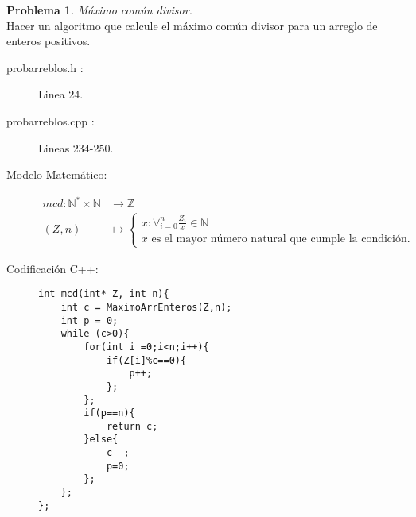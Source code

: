 \documentclass{article}
\theoremstyle{plain}
\theoremstyle{definition}
\newtheorem{problem}{Problema}
\begin{document}
\begin{problem} \emph{Máximo común divisor.}\\
\hspace*{7mm}Hacer un algoritmo que calcule el máximo común divisor para un arreglo de enteros positivos.
\begin{description}
\item[probarreblos.h :] Linea 24. \item[probarreblos.cpp :] Lineas 234-250.

\item[Modelo Matemático:]
\begin{align*}
mcd: \mathbb{N}^{*}\times\mathbb{N} &\to \mathbb{Z}\\
(Z,n) &\mapsto
\begin{cases}
x:\forall_{i=0}^{n} \frac{Z_{i}}{x}\in \mathbb{N}\\
\text{$x$ es el mayor número natural que cumple la condición.}
\end{cases}
\end{align*}
%
\item[Codificación \textsf{C++}:]\hfill
%
\begin{verbatim}
int mcd(int* Z, int n){
    int c = MaximoArrEnteros(Z,n);
    int p = 0;
    while (c>0){
        for(int i =0;i<n;i++){
            if(Z[i]%c==0){
                p++;
            };
        };
        if(p==n){
            return c;
        }else{
            c--;
            p=0;
        };
    };
};
\end{verbatim}
\end{description}
\end{problem}
\end{document}
